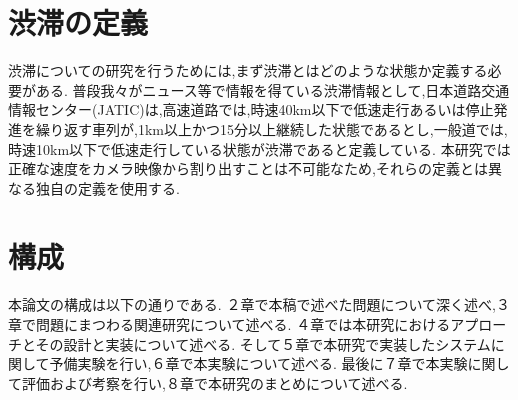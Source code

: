 

\section{渋滞の定義}
渋滞についての研究を行うためには,まず渋滞とはどのような状態か定義する必要がある.
普段我々がニュース等で情報を得ている渋滞情報として,日本道路交通情報センター(JATIC)は,高速道路では,時速40km以下で低速走行あるいは停止発進を繰り返す車列が,1km以上かつ15分以上継続した状態であるとし,一般道では,時速10km以下で低速走行している状態が渋滞であると定義している.
本研究では正確な速度をカメラ映像から割り出すことは不可能なため,それらの定義とは異なる独自の定義を使用する.


\section{構成}
本論文の構成は以下の通りである.
２章で本稿で述べた問題について深く述べ,３章で問題にまつわる関連研究について述べる.
４章では本研究におけるアプローチとその設計と実装について述べる.
そして５章で本研究で実装したシステムに関して予備実験を行い,６章で本実験について述べる.
最後に７章で本実験に関して評価および考察を行い,８章で本研究のまとめについて述べる.
